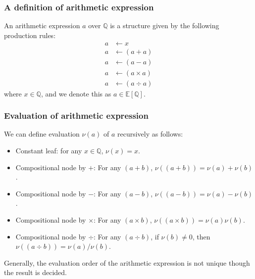\documentclass[aspectratio=169]{beamer}
\begin{document}
\begin{frame}
\frametitle{A definition of arithmetic expression}
\begin{definition}\label{def:arithmetic-expression}
    An arithmetic expression $a$ over $\mathbb{Q}$ is a structure given by the following production rules:
\begin{equation}\label{eq:productionrule}
\begin{aligned}
a &\longleftarrow x\\
a &\longleftarrow ( a + a )\\
a &\longleftarrow ( a - a )\\
a &\longleftarrow ( a \times a )\\
a &\longleftarrow ( a \div a )
\end{aligned}
\end{equation}
    where $x \in \mathbb{Q}$, and we denote this as $a \in \mathbb{E} \left [\mathbb{Q} \right ]$.
\end{definition}
\end{frame}

\begin{frame}
\frametitle{Evaluation of arithmetic expression}
We can define evaluation $\nu(a)$ of $a$ recursively as follows:
\begin{itemize}
  \item Constant leaf: for any $x \in \mathbb{Q}$, $\nu(x) = x$.
  \item Compositional node by $+$: For any $(a + b)$, $\nu((a + b)) = \nu(a) + \nu(b)$.
  \item Compositional node by $-$: For any $(a - b)$, $\nu((a - b)) = \nu(a) - \nu(b)$.
  \item Compositional node by $\times$: For any $(a \times b)$, $\nu((a \times b)) = \nu(a) \nu(b)$.
  \item Compositional node by $\div$: For any $(a \div b)$, if $\nu(b) \neq 0$, then $\nu((a \div b)) = \nu(a) / \nu(b)$.
\end{itemize}
Generally, the evaluation order of the arithmetic expression is not unique though the result is decided.
\end{frame}
\end{document}
